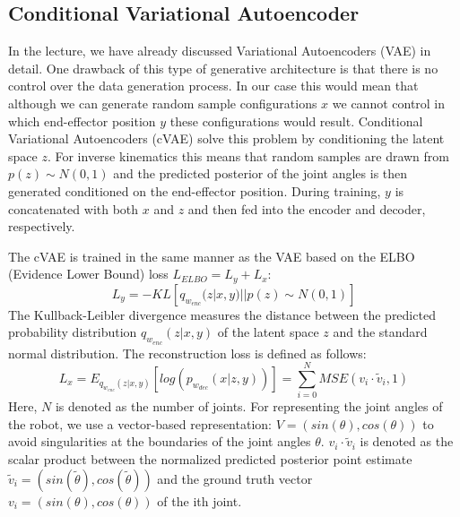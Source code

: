 \documentclass[conference]{IEEEtran}
\begin{document}
\subsection*{Conditional Variational Autoencoder}
In the lecture, we have already discussed Variational Autoencoders (VAE) \cite{Kingma2014} in detail. One drawback of this type of generative architecture is that there is no control over the data generation process. In our case this would mean that although we can generate random sample configurations $x$ we cannot control in which end-effector position $y$ these configurations would result. Conditional Variational Autoencoders (cVAE) \cite{Sohn2015} solve this problem by conditioning the latent space $z$. For inverse kinematics this means that random samples are drawn from $p(z) \sim N(0, 1)$ and the predicted posterior of the joint angles is then generated conditioned on the end-effector position. During training, $y$ is concatenated with both $x$ and $z$ and then fed into the encoder and decoder, respectively.

The cVAE is trained in the same manner as the VAE based on the ELBO (Evidence Lower Bound) loss $L_{ELBO} = L_y + L_x$:
\begin{equation}
L_y = - KL[q_{w_{enc}}(z | x, y) || p(z) \sim N(0, 1) ]
\label{KL}
\end{equation}
The Kullback-Leibler divergence measures the distance between the predicted probability distribution $q_{w_{enc}}(z | x, y)$ of the latent space $z$ and the standard normal distribution. The reconstruction loss is defined as follows: 
\begin{equation}
L_x = E_{q_{w_{enc}}(z | x, y)}[log(p_{w_{dec}}(x| z, y))] = \sum _ {i=0} ^ N MSE(v_i \cdot \tilde v_i, 1)
\label{MSE}
\end{equation}
Here, $N$ is denoted as the  number of joints. For representing the joint angles of the robot, we use a vector-based representation: $V = (sin(\theta), cos(\theta))$ to avoid singularities at the boundaries of the joint angles $\theta$. $v_i \cdot \tilde v_i$ is denoted as the scalar product between the normalized predicted posterior point estimate  $\tilde v_i  = (sin(\tilde \theta), cos(\tilde \theta))$ and the ground truth vector  $v_i = (sin(\theta), cos(\theta))$ of the ith joint.
\end{document}
